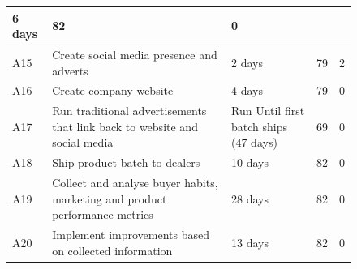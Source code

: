 \documentclass{article}
\begin{document}
\begin{figure}[H]
\begin{tabular}{|p{0.65cm}|p{5cm}|p{3cm}|l|l|}
        6 days  & 82 & 0 \\ \hline
        \rowcolor{red!10}  A15 & Create social media presence and adverts &
        2 days  & 79 & 2 \\ \hline
        \rowcolor{red!15} A16 & Create company website &
        4 days  & 79 & 0 \\ \hline
        \rowcolor{red!20} A17 & Run traditional advertisements that link back to website and
        social media &
        Run Until first batch ships (47 days)  & 69 & 0 \\ \hline
        \rowcolor{red!25} A18 & Ship product batch to dealers &
        10 days  & 82 & 0 \\ \hline
        \rowcolor{red!30} A19 & Collect and analyse buyer habits, marketing and product performance metrics &
        28 days & 82 & 0 \\ \hline
        \rowcolor{red!35} A20 & Implement improvements based on collected information &
        13 days  & 82 & 0 \\ \hline
      \end{tabular}
    \end{figure}
\end{document}
